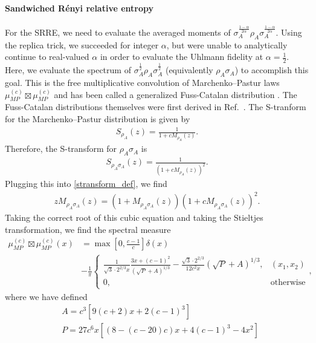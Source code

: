 \documentclass[a4paper,11pt]{article}
\begin{document}
\paragraph{Sandwiched R\'enyi relative entropy}
For the SRRE, we need to evaluate the averaged moments of $\sigma_A^{\frac{1-\alpha}{2\alpha}}\rho_A\sigma_A^{\frac{1-\alpha}{2\alpha}}$. Using the replica trick, we succeeded for integer $\alpha$, but were unable to analytically continue to real-valued $\alpha$ in order to evaluate the Uhlmann fidelity at $\alpha = \frac{1}{2}$. Here, we evaluate the spectrum of $\sigma_A^{\frac{1}{2}}\rho_A \sigma_A^{\frac{1}{2}}$ (equivalently $\rho_A \sigma_A$) to accomplish this goal. This is the free multiplicative convolution of Marchenko–Pastur laws $\mu^{(c)}_{MP} \boxtimes \mu^{(c)}_{MP}$ and has been called a generalized Fuss-Catalan distribution \cite{2015PhRvE..92a2121M}. The Fuss-Catalan distributions themselves were first derived in Ref.~\cite{2011PhRvE..83f1118P}. The S-tranform for the Marchenko–Pastur distribution is given by
\begin{align}
    S_{\rho_A}(z) = \frac{1}{1+cM_{\rho_A}(z)}. 
\end{align}
Therefore, the S-transform for $\rho_A \sigma_A$ is
\begin{align}
    S_{\rho_A \sigma_A}(z) = \frac{1}{\left(1+cM_{\rho_A}(z)\right)^2}. 
\end{align}
Plugging this into \eqref{stransform_def}, we find
\begin{align}
    z M_{\rho_A \sigma_A}(z) = (1+M_{\rho_A \sigma_A}(z))(1+cM_{\rho_A \sigma_A}(z))^2.
\end{align}
Taking the correct root of this cubic equation and taking the Stieltjes transformation, we find the spectral measure
\begin{align}
    \mu^{(c)}_{MP} \boxtimes \mu^{(c)}_{MP}(x) &= \max\left[0,\frac{c-1}{c}\right]\delta (x)\nonumber\\&- \frac{1}{\pi } \begin{cases}
\frac{1}{\sqrt{3} \cdot 2^{2/3}x } \frac{3x+(c-1)^2}{\left( \sqrt{P}+A\right) ^{1/3} }-\frac{\sqrt{3} \cdot 2^{2/3} }{12c^2x} \left( \sqrt{P}+A\right) ^{1/3} ,&(x_1,x_2) \\
0, & \text{otherwise}
\end{cases},
\label{MP_squared_eq}
\end{align}
where we have defined
\begin{equation}
\begin{split}
& A = c^3 \left[ 9(c+2)x+2(c-1)^3\right]  \\
& P = 27c^6 x\left[ \left( 8-(c-20)c\right) x+4(c-1)^3-4x^2\right] 
\end{split}
\end{equation}
\end{document}
